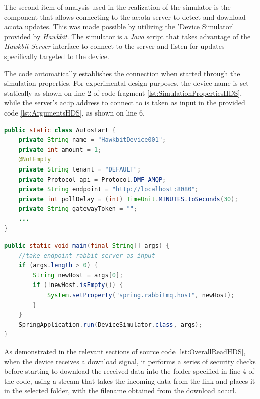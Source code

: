 The second item of analysis used in the realization of the simulator is the component that allows connecting to the \gls{ac:ota} server to detect and download \gls{ac:ota} updates. This was made possible by utilizing the 'Device Simulator' provided by \textit{Hawkbit}. The simulator is a \textit{Java} script that takes advantage of the \textit{Hawkbit Server} interface to connect to the server and listen for updates specifically targeted to the device.

The code automatically establishes the connection when started through the simulation properties. For experimental design purposes, the device name is set statically as shown on line 2 of code fragment \ref{lst:SimulationPropertiesHDS}, while the server's \gls{ac:ip} address to connect to is taken as input in the provided code \ref{lst:ArgumentsHDS}, as shown on line 6.

\begin{lstlisting}[language=Java, caption={Simulation properties of the \textit{Hawkbit Device Simulator}}, label=lst:SimulationPropertiesHDS]
public static class Autostart {
    private String name = "HawkbitDevice001";
    private int amount = 1;
    @NotEmpty
    private String tenant = "DEFAULT";
    private Protocol api = Protocol.DMF_AMQP;
    private String endpoint = "http://localhost:8080";
    private int pollDelay = (int) TimeUnit.MINUTES.toSeconds(30);
    private String gatewayToken = "";
    ...
}
\end{lstlisting}

\lstset{numbers=left}
\begin{lstlisting}[language=Java, caption={Input arguments to set the ip of the \textit{OTA} server to contact}, label=lst:ArgumentsHDS]
public static void main(final String[] args) {
    //take endpoint rabbit server as input
    if (args.length > 0) {
        String newHost = args[0];
        if (!newHost.isEmpty()) {
            System.setProperty("spring.rabbitmq.host", newHost);
        }
    }
    SpringApplication.run(DeviceSimulator.class, args);
}
\end{lstlisting}

As demonstrated in the relevant sections of source code \ref{lst:OverallReadHDS}, when the device receives a download signal, it performs a series of security checks before starting to download the received data into the folder specified in line 4 of the code, using a stream that takes the incoming data from the link and places it in the selected folder, with the filename obtained from the download \gls{ac:url}.

